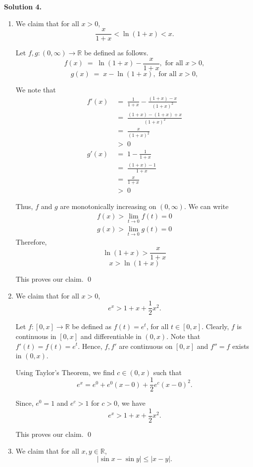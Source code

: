 \documentclass[10pt]{article}
\begin{document}
	\textbf{Solution 4.}
	\begin{enumerate}
		\item We claim that for all $x > 0$,
		\[ \frac{x}{1 + x} < \ln(1 + x) < x. \]
		
		Let $f, g\colon (0, \infty) \to \mathbb{R}$ be defined as follows.
		\[f(x) \;=\; \ln(1 + x) - \frac{x}{1 + x}, \text{ for all } x > 0,\]
		\[g(x) \;=\; x - \ln(1 + x), \text{ for all } x > 0,\]
		
		We note that
		\begin{align*}
			f'(x) \;&=\; \frac{1}{1 + x} - \frac{(1 + x) - x}{(1 + x)^2} \\
			\;&=\; \frac{(1 + x) - (1 + x) + x}{(1 + x)^2} \\
			\;&=\; \frac{x}{(1 + x)^2} \\
			\;&>\; 0 \\
			g'(x) \;&=\; 1 - \frac{1}{1 + x} \\
			\;&=\; \frac{(1 + x) - 1}{1 + x} \\
			\;&=\; \frac{x}{1 + x} \\
			\;&>\; 0
		\end{align*}
		
		Thus, $f$ and $g$ are monotonically increasing on $(0, \infty)$. We can write
		\begin{align*}
			f(x) > \lim_{t \to 0} f(t) = 0 \\
			g(x) > \lim_{t \to 0} g(t) = 0
		\end{align*}
		Therefore, 
		\[\ln(1 + x) > \frac{x}{1 + x}\]
		\[x > \ln(1 + x)\]
		
		This proves our claim. \qed
		
		\item We claim that for all $x > 0$,
		\[ e^x > 1 + x + \frac{1}{2}x^2. \]
		
		Let $f\colon [0, x] \to \mathbb{R}$ be defined as $f(t) = e^t$, for all $t \in [0, x]$.
		Clearly, $f$ is continuous in $[0, x]$ and differentiable in $(0, x)$. Note that $f'(t) = f(t) = e^t$.
		Hence, $f, f'$ are continuous on $[0, x]$ and $f'' = f$ exists in $(0, x)$.
		
		Using Taylor's Theorem, we find $c \in (0, x)$ such that
		\[e^x = e^0 + e^0(x - 0) + \frac{1}{2}e^c(x - 0)^2.\]
		
		Since, $e^0 = 1$ and $e^c > 1$ for $c > 0$, we have
		\[e^x > 1 + x + \frac{1}{2}x^2.\]
		
		This proves our claim. \qed
		
		
		\item We claim that for all $x, y \in \mathbb{R}$,
		\[
		|\sin{x} - \sin{y}| \le |x - y|.
		\]
		

\end{enumerate}
\end{document}
